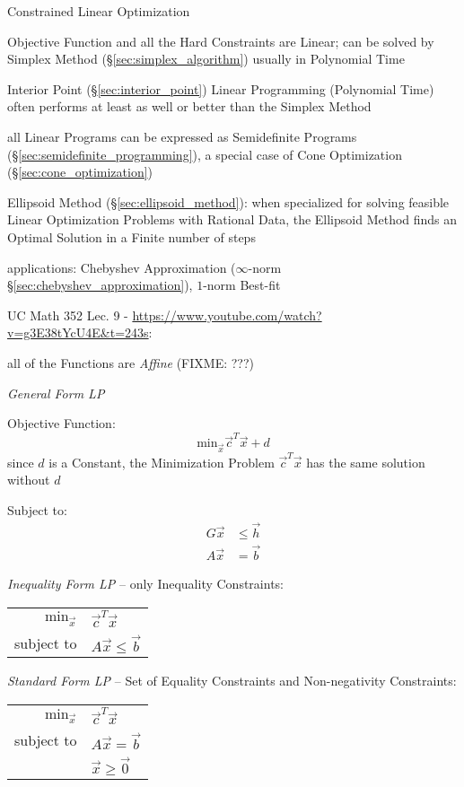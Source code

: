 Constrained Linear Optimization

Objective Function and all the Hard Constraints are Linear; can be solved by
Simplex Method (\S\ref{sec:simplex_algorithm}) usually in Polynomial Time

Interior Point (\S\ref{sec:interior_point}) Linear Programming
(Polynomial Time) often performs at least as well or better than the Simplex
Method

all Linear Programs can be expressed as Semidefinite Programs
(\S\ref{sec:semidefinite_programming}), a special case of Cone Optimization
(\S\ref{sec:cone_optimization})

Ellipsoid Method (\S\ref{sec:ellipsoid_method}): when specialized for solving
feasible Linear Optimization Problems with Rational Data, the Ellipsoid Method
finds an Optimal Solution in a Finite number of steps

applications: Chebyshev Approximation ($\infty$-norm
\S\ref{sec:chebyshev_approximation}), $1$-norm Best-fit


UC Math 352 Lec. 9 - \url{https://www.youtube.com/watch?v=g3E38tYcU4E&t=243s}:

all of the Functions are \emph{Affine} (FIXME: ???)

\emph{General Form LP}

Objective Function:
\[
  \mathrm{min}_{\vec{x}} \vec{c}^T\vec{x} + d
\]
since $d$ is a Constant, the Minimization Problem $\vec{c}^T\vec{x}$ has the
same solution without $d$

Subject to:
\begin{align*}
  G\vec{x} & \leq \vec{h} \\
  A\vec{x} & = \vec{b}
\end{align*}

\emph{Inequality Form LP} -- only Inequality Constraints:

\begin{tabular}{r l}
  $\mathrm{min}_{\vec{x}}$ & $\vec{c}^T\vec{x}$      \\
  subject to               & $A\vec{x} \leq \vec{b}$ \\
\end{tabular}

\emph{Standard Form LP} -- Set of Equality Constraints and Non-negativity
Constraints:

\begin{tabular}{r l}
  $\mathrm{min}_{\vec{x}}$ & $\vec{c}^T\vec{x}$     \\
  subject to               & $A\vec{x} = \vec{b}$   \\
                           & $\vec{x} \geq \vec{0}$ \\
\end{tabular}

